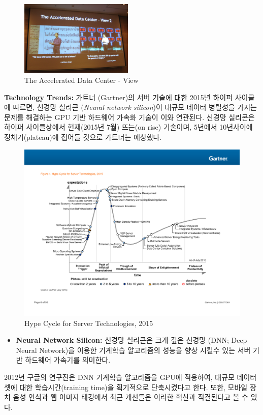 \documentclass[twocolumn]{article}
\newcommand{\bi}{\begin{itemize}}
\newcommand{\ei}{\end{itemize}}
\newcommand{\ii}{\item}
\begin{document}
\begin{figure}[htb]
        \centering
        \includegraphics[width=0.48\textwidth]{marc-ppt.png}
        \caption{The Accelerated Data Center - View}
        \label{fig:accelerated-data-center}
\end{figure}

\noindent
\textbf{Technology Trends:}  가트너 (Gartner)의 서버 기술에 대한 2015년 하이퍼 사이클 \cite{George:2015}에 따르면, 신경망 실리콘 (\textit{Neural network silicon})이 대규모 데이터 병렬성을 가지는 문제를 해결하는 GPU 기반 하드웨어 가속화 기술이 이와 연관된다. 신경망 실리콘은 하이퍼 사이클상에서 현재(2015년 7월) 뜨는(on rise) 기술이며, 5년에서 10년사이에 정체기(plateau)에 접어들 것으로 가트너는 예상했다.
\begin{figure}[htb]
        \centering
        \includegraphics[width=1.0\textwidth]{gartner-server.pdf}
        \caption{Hype Cycle for Server Technologies, 2015 \cite{George:2015}}
        \label{fig:accelerated-data-center}
\end{figure}
\bi
\ii \textbf{Neural Network Silicon:} 신경망 실리콘은 크게 깊은 신경망 (DNN; Deep Neural Network)을 이용한 기계학습 알고리즘의 성능을 향상 시킬수 있는 서버 기반 하드웨어 가속기를 의미한다. 
\ei
2012년 구글의 연구진은 DNN 기계학습 알고리즘을 GPU에 적용하여, 대규모 데이터 셋에 대한 학습시간(training time)을 획기적으로 단축시켰다고 한다.
또한, 모바일 장치 음성 인식과 웹 이미지 태깅에서 최근 개선들은 이러한 혁신과 직결된다고 볼 수 있다.
\end{document}
